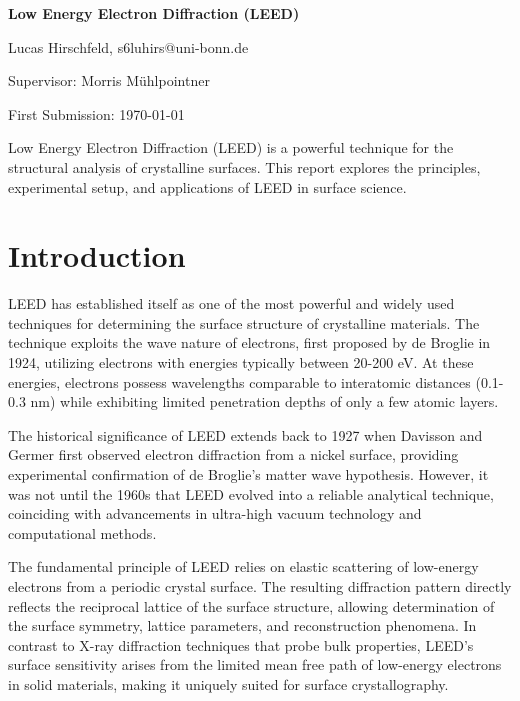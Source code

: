 \documentclass[fontsize=11pt,reqno,a4paper,oneside]{scrartcl}
\makeatletter
\def\Autor{Lucas Hirschfeld, s6luhirs@uni-bonn.de}
\def\Titel{Low Energy Electron Diffraction (\ac{LEED})}
\def\Date{First Submission: \today}
\def\PiC{Supervisor: Morris Mühlpointner}
\def\Abstract{Low Energy Electron Diffraction (\ac{LEED}) is a powerful technique for the structural analysis of crystalline surfaces. This report explores the principles, experimental setup, and applications of \ac{LEED} in surface science.}
\makeatother
\begin{document}
\pagestyle{empty}
\begin{titlepage}
    \begin{center}
        \vspace*{\fill}
        {\LARGE\bfseries \Titel}\par\vspace{2cm}
        {\Autor\par\vspace{0.5cm}\PiC\par\vspace{1cm}\par\vspace{0.2cm}\Date\par\vspace{5cm}}
    \end{center}
    {\Abstract\vspace{0.5cm}\par}\vfill
\end{titlepage}

\pagestyle{scrheadings}
\tableofcontents
{}
\clearpage

\section{Introduction}

\ac{LEED} has established itself as one of the most powerful and widely used techniques for determining the surface structure of crystalline materials\supercite{VanHove1986}. The technique exploits the wave nature of electrons, first proposed by de Broglie in 1924, utilizing electrons with energies typically between 20-200 eV. At these energies, electrons possess wavelengths comparable to interatomic distances (0.1-0.3 nm) while exhibiting limited penetration depths of only a few atomic layers\supercite{Woodruff2016}.

The historical significance of \ac{LEED} extends back to 1927 when Davisson and Germer first observed electron diffraction from a nickel surface, providing experimental confirmation of de Broglie's matter wave hypothesis\supercite{Davisson1927}. However, it was not until the 1960s that \ac{LEED} evolved into a reliable analytical technique, coinciding with advancements in ultra-high vacuum technology and computational methods\supercite{Pendry1990}.

The fundamental principle of \ac{LEED} relies on elastic scattering of low-energy electrons from a periodic crystal surface. The resulting diffraction pattern directly reflects the reciprocal lattice of the surface structure, allowing determination of the surface symmetry, lattice parameters, and reconstruction phenomena\supercite{Ertl}. In contrast to X-ray diffraction techniques that probe bulk properties, \ac{LEED}'s surface sensitivity arises from the limited mean free path of low-energy electrons in solid materials, making it uniquely suited for surface crystallography\supercite{Seah1979}.
\end{document}
